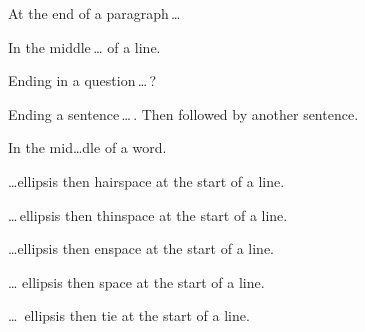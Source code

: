 

At the end of a paragraph\,…

In the middle\,… of a line.

Ending in a question\,…\,?

Ending a sentence\,…\,.
Then followed by another sentence.

In the mid…dle of a word.

…\hairspace ellipsis then hairspace at the start of a line.

…\,ellipsis then thinspace at the start of a line.

…\enspace ellipsis then enspace at the start of a line.

… ellipsis then space at the start of a line.

…~ellipsis then tie at the start of a line.

\endbook
